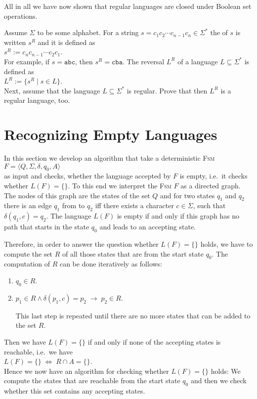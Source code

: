 All in all we have now shown that regular languages are closed under Boolean set operations.

\exerciseEng
Assume $\Sigma$ to be some alphabet.  For a string $s=c_1 c_2 \cdots c_{n-1} c_n \in \Sigma^*$ the
 
of $s$ is written $s^R$ and it is defined as
\\[0.2cm]
\hspace*{1.3cm}
$s^R := c_n c_{n-1} \cdots c_2 c_1$.
\\[0.2cm]
For example, if $s = \mathtt{abc}$, then $s^R = \mathtt{cba}$. The reversal $L^R$ of a language 
$L \subseteq \Sigma^*$ is defined as 
\\[0.2cm]
\hspace*{1.3cm}
$L^R := \{ s^R \mid s \in L \}$.
\\[0.2cm]
Next, assume that the language $L \subseteq \Sigma^*$ is regular.  Prove that then $L^R$ is a regular
language, too. \eox

\section{Recognizing Empty Languages \label{section:leer}}
In this section we develop an algorithm that take a deterministic \textsc{Fsm}
\\[0.2cm]
\hspace*{1.3cm}
$F = \langle Q, \Sigma, \delta, q_0, A \rangle$
\\[0.2cm]
as input and checks, whether the language accepted by $F$ is empty, i.e.~it checks whether 
$L(F) = \{\}$.  To this end we interpret the \textsc{Fsm} $F$ as a directed graph.  The nodes of this graph are the
states of the set $Q$ and for two states $q_1$ and
$q_2$ there is an edge  $q_1$ from to $q_2$ iff there exists a character $c \in \Sigma$, such that $\delta(q_1,
c) = q_2$.  
The language $L(F)$ is empty if and only if this graph has no path that starts in the state
$q_0$ and leads to an accepting state.

Therefore, in order to answer the question whether $L(F) = \{\}$ holds, we have to compute the set $R$
of all those states that are  from the start state $q_0$.  The computation of $R$ can be done
iteratively as follows:
\begin{enumerate}
\item $q_0 \in R$.
\item $p_1 \in R \wedge \delta(p_1,c) = p_2 \;\rightarrow\; p_2 \in R$.

      This last step is repeated until there are no more states that can be added to the set $R$.
\end{enumerate}
Then we have $L(F) = \{\}$ if and only if none of the accepting states is reachable, i.e.~we have
\\[0.2cm]
\hspace*{1.3cm}
$L(F) = \{\} \;\Leftrightarrow\; R \cap A = \{\}$.
\\[0.2cm]
Hence we now have an algorithm for checking whether $L(F) = \{\}$ holds:
We compute the states that are reachable from the start state $q_0$ and then we check whether this set
contains any accepting states.


